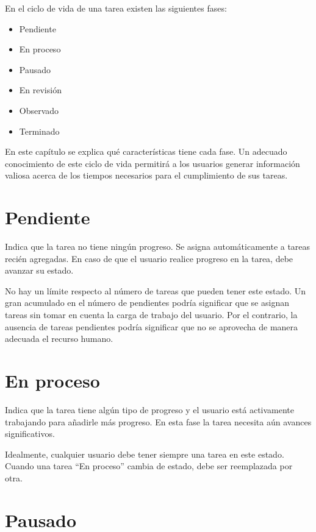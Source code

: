 \documentclass[
  letterpaper,
  DIV=11,
  numbers=noendperiod]{scrreprt}
\providecommand{\tightlist}{%
  \setlength{\itemsep}{0pt}\setlength{\parskip}{0pt}}\usepackage{longtable,booktabs,array}
\begin{document}
En el ciclo de vida de una tarea existen las siguientes fases:

\begin{itemize}
\tightlist
\item
  Pendiente
\item
  En proceso
\item
  Pausado
\item
  En revisión
\item
  Observado
\item
  Terminado
\end{itemize}

En este capítulo se explica qué características tiene cada fase. Un
adecuado conocimiento de este ciclo de vida permitirá a los usuarios
generar información valiosa acerca de los tiempos necesarios para el
cumplimiento de sus tareas.

\hypertarget{pendiente}{%
\section{Pendiente}\label{pendiente}}

Indica que la tarea no tiene ningún progreso. Se asigna automáticamente
a tareas recién agregadas. En caso de que el usuario realice progreso en
la tarea, debe avanzar su estado.

No hay un límite respecto al número de tareas que pueden tener este
estado. Un gran acumulado en el número de pendientes podría significar
que se asignan tareas sin tomar en cuenta la carga de trabajo del
usuario. Por el contrario, la ausencia de tareas pendientes podría
significar que no se aprovecha de manera adecuada el recurso humano.

\hypertarget{en-proceso}{%
\section{En proceso}\label{en-proceso}}

Indica que la tarea tiene algún tipo de progreso y el usuario está
activamente trabajando para añadirle más progreso. En esta fase la tarea
necesita aún avances significativos.

Idealmente, cualquier usuario debe tener siempre una tarea en este
estado. Cuando una tarea ``En proceso'' cambia de estado, debe ser
reemplazada por otra.

\hypertarget{pausado}{%
\section{Pausado}\label{pausado}}
\end{document}
